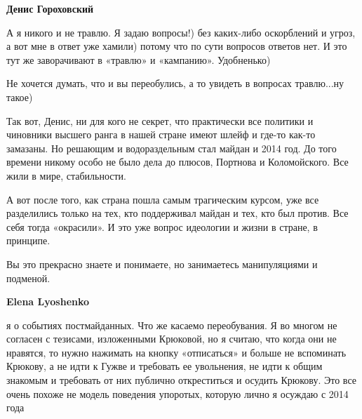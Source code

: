\begin{itemize}
\begin{itemize}
 

\textbf{Денис Гороховский}

А я никого и не травлю. Я задаю вопросы!) без каких-либо оскорблений и угроз, а
вот мне в ответ уже хамили) потому что по сути вопросов ответов нет. И это тут
же заворачивают в «травлю» и «кампанию». Удобненько)

Не хочется думать, что и вы переобулись, а то увидеть в вопросах травлю...ну
такое)

Так вот, Денис, ни для кого не секрет, что практически все политики и чиновники
высшего ранга в нашей стране имеют шлейф и где-то как-то замазаны. Но решающим
и водораздельным стал майдан и 2014 год. До того времени никому особо не было
дела до плюсов, Портнова и Коломойского. Все жили в мире, стабильности.

А вот после того, как страна пошла самым трагическим курсом, уже все
разделились только на тех, кто поддерживал майдан и тех, кто был против. Все
себя тогда «окрасили». И это уже вопрос идеологии и жизни в стране, в принципе.

Вы это прекрасно знаете и понимаете, но занимаетесь манипуляциями и подменой.

 

\textbf{Elena Lyoshenko} 

я о событиях постмайданных. Что же касаемо переобувания. Я во многом не
согласен с тезисами, изложенными Крюковой, но я считаю, что когда они не
нравятся, то нужно нажимать на кнопку «отписаться» и больше не вспоминать
Крюкову, а не идти к Гужве и требовать ее увольнения, не идти к общим знакомым
и требовать от них публично откреститься и осудить Крюкову. Это все очень
похоже не модель поведения упоротых, которую лично я осуждаю с 2014 года

 


\end{itemize}
\end{itemize}
